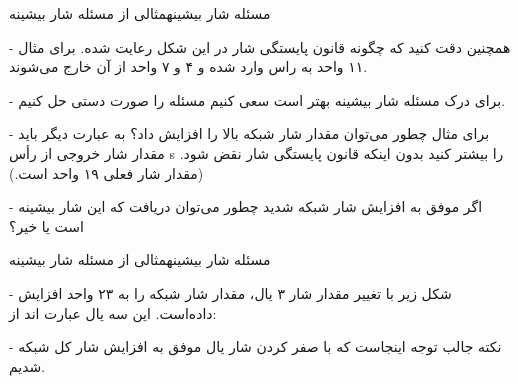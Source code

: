 \begin{itemframe}{مسئله شار بیشینه}{مثالی از مسئله شار بیشینه}
\item[-]
همچنین دقت کنید که چگونه قانون پایستگی شار در این شکل رعایت شده. برای مثال ۱۱ واحد به راس
وارد شده و ۴ و ۷ واحد از آن خارج می‌شوند.
\item[-]
برای درک مسئله شار بیشینه بهتر است سعی کنیم مسئله را صورت دستی حل کنیم.
\item[-]
برای مثال چطور می‌توان مقدار شار شبکه بالا را افزایش داد؟ به عبارت دیگر باید مقدار شار خروجی از رأس s را بیشتر کنید بدون اینکه قانون پایستگی شار نقض شود. (مقدار شار فعلی ۱۹ واحد است.)
\item[-]
اگر موفق به افزایش شار شبکه شدید چطور می‌توان دریافت که این شار بیشینه است یا خیر؟

\end{itemframe}

\begin{itemframe}{مسئله شار بیشینه}{مثالی از مسئله شار بیشینه}
\item[-]
شکل زیر با تغییر مقدار شار ۳ یال، مقدار شار شبکه را به ۲۳ واحد افزایش داده‌است. این سه یال عبارت اند از:

\item[-]
نکته جالب توجه اینجاست که با صفر کردن شار یال
موفق به افزایش شار کل شبکه شدیم.
\end{itemframe}